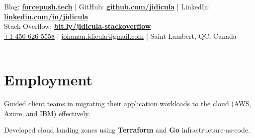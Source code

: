 \documentclass[]{jidicula-resume}
\begin{document}
\livelocation\hfill\lastupdated{}

{ Blog: \href{http://bit.ly/jidicula-site}{\bf forcepush.tech}
  | GitHub: \href{http://bit.ly/jidicula_github}{\bf github.com/jidicula} | LinkedIn: \href{https://bit.ly/jidicula-linkedin}{\bf linkedin.com/in/jidicula} \\
  Stack Overflow: \href{https://bit.ly/jidicula-stackoverflow}{\bf bit.ly/jidicula-stackoverflow} \\
  \href{tel:14506265558}{+1-450-626-5558}
  | \href{mailto:johanan.idicula+resume@gmail.com}{johanan.idicula@gmail.com}
  | Saint-Lambert, QC, Canada \\~\\
}

\section{Employment}

\vspace{\topsep} %
\begin{tightemize}
\item Guided client teams in migrating their application workloads to the cloud (AWS, Azure, and IBM) effectively.
\end{tightemize}
\sectionsep{}

\vspace{\topsep} %
\begin{tightemize}
\item Developed cloud landing zones using \textbf{Terraform} and \textbf{Go} infrastructure-as-code.
\end{tightemize}
\sectionsep{}
\end{document}
